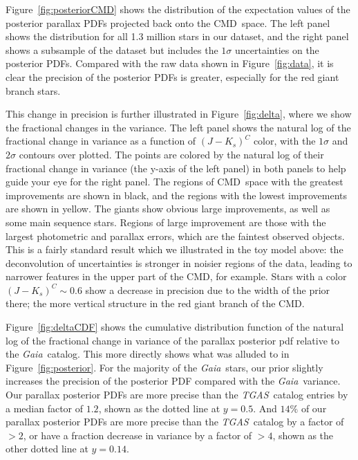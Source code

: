 \documentclass[modern]{aastex61}
\newcommand{\acronym}[1]{{\small{#1}}}
\newcommand{\project}[1]{\textsl{#1}}
\newcommand{\tgas}{\project{\acronym{TGAS}}}
\newcommand{\gaia}{\project{Gaia}}
\newcommand{\cmd}{\acronym{CMD}}
\begin{document}
Figure~\ref{fig:posteriorCMD} shows the distribution of the expectation values of the posterior parallax PDFs projected back onto the \cmd\ space.
The left panel shows the distribution for all 1.3 million stars in our dataset, and the right panel shows a subsample of the dataset but includes the $1\sigma$ uncertainties on the posterior PDFs.
Compared with the raw data shown in Figure~\ref{fig:data}, it is clear the precision of the posterior PDFs is greater, especially for the red giant branch stars.

This change in precision is further illustrated in Figure~\ref{fig:delta}, where we show the fractional changes in the variance. The left panel shows the natural log of the fractional change in variance as a function of $(J-K_s)^C$ color, with the $1\sigma$ and $2\sigma$ contours over plotted.
The points are colored by the natural log of their fractional change in variance (the y-axis of the left panel) in both panels to help guide your eye for the right panel. The regions of \cmd\ space with the greatest improvements are shown in black, and the regions with the lowest improvements are shown in yellow.
The giants show obvious large improvements, as well as some main sequence stars.
Regions of large improvement are those with the largest photometric and parallax errors, which are the faintest observed objects.
This is a fairly standard result which we illustrated in the toy model above: the deconvolution of uncertainties is stronger in noisier regions of the data, leading to narrower features in the upper part of the \cmd, for example.
Stars with a color $(J-K_s)^C \sim 0.6$ show a decrease in precision due to the width of the prior there; the more vertical structure in the red giant branch of the \cmd.

Figure~\ref{fig:deltaCDF} shows the cumulative distribution function of the natural log of the fractional change in variance of the parallax posterior pdf relative to the \gaia\ catalog. This more directly shows what was alluded to in Figure~\ref{fig:posterior}. For the majority of the \gaia\ stars, our prior slightly increases the precision of the posterior PDF compared with the \gaia\ variance. Our parallax posterior PDFs are more precise than the \tgas\ catalog entries by a median factor of $1.2$, shown as the dotted line at $y=0.5$.
And $14\%$ of our parallax posterior PDFs are more precise than the \tgas\ catalog by a factor of $>2$, or have a fraction decrease in variance by a factor of $>4$, shown as the other dotted line at $y=0.14$.
\end{document}

